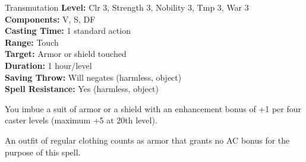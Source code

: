 {Transmutation}
{
	\textbf{Level:}
	Clr 3, Strength 3, Nobility 3, Tmp 3, War 3\\
	\textbf{Components:}
	V, S, DF\\
	\textbf{Casting Time:}
	1 standard action\\
	\textbf{Range:}
	Touch\\
	\textbf{Target:}
	Armor or shield touched\\
	\textbf{Duration:}
	1 hour/level\\
	\textbf{Saving Throw:}
	Will negates (harmless, object)\\
	\textbf{Spell Resistance:}
	Yes (harmless, object)\\
}
{
	You imbue a suit of armor or a shield with an enhancement bonus of +1 per four caster levels (maximum +5 at 20th level).

	An outfit of regular clothing counts as armor that grants no AC bonus for the purpose of this spell.

}
